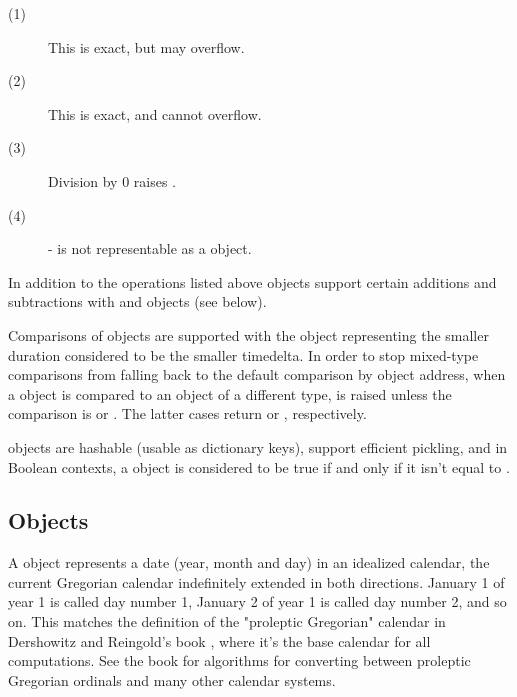\begin{description}
\item[(1)]
  This is exact, but may overflow.

\item[(2)]
  This is exact, and cannot overflow.

\item[(3)]
  Division by 0 raises .

\item[(4)]
  - is not representable as a  object.
\end{description}

In addition to the operations listed above  objects
support certain additions and subtractions with  and
 objects (see below).

Comparisons of  objects are supported with the
 object representing the smaller duration considered
to be the smaller timedelta.
In order to stop mixed-type comparisons from falling back to the
default comparison by object address, when a  object is
compared to an object of a different type,  is
raised unless the comparison is \code{==} or \code{!=}.  The latter
cases return  or , respectively.

 objects are hashable (usable as dictionary keys),
support efficient pickling, and in Boolean contexts, a 
object is considered to be true if and only if it isn't equal to
.


\subsection{ Objects \label{datetime-date}}

A  object represents a date (year, month and day) in an idealized
calendar, the current Gregorian calendar indefinitely extended in both
directions.  January 1 of year 1 is called day number 1, January 2 of year
1 is called day number 2, and so on.  This matches the definition of the
"proleptic Gregorian" calendar in Dershowitz and Reingold's book
, where it's the base calendar for all
computations.  See the book for algorithms for converting between
proleptic Gregorian ordinals and many other calendar systems.

